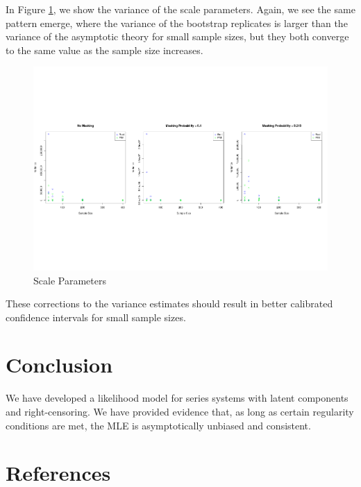 \documentclass[
]{article}
\begin{document}
In Figure \ref{fig:ci-boot-scale}, we show the variance of the scale
parameters. Again, we see the same pattern emerge, where the variance of
the bootstrap replicates is larger than the variance of the asymptotic
theory for small sample sizes, but they both converge to the same value
as the sample size increases.

\begin{figure}

{\centering \includegraphics[width=1\linewidth]{wei_series_md_files/figure-latex/ci-boot-scale-1} 

}

\caption{Scale Parameters}\label{fig:ci-boot-scale}
\end{figure}

These corrections to the variance estimates should result in better
calibrated confidence intervals for small sample sizes.

\hypertarget{conclusion}{%
\section{Conclusion}\label{conclusion}}

We have developed a likelihood model for series systems with latent
components and right-censoring. We have provided evidence that, as long
as certain regularity conditions are met, the MLE is asymptotically
unbiased and consistent.

\hypertarget{references}{%
\section*{References}\label{references}}
\end{document}
